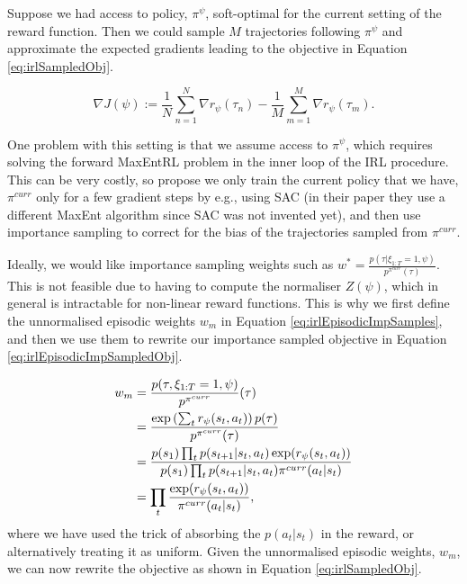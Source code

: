 \documentclass{report}
\numberwithin{equation}{section}
\numberwithin{figure}{section}
\numberwithin{table}{section}
\numberwithin{algorithm}{section}
\begin{document}
Suppose we had access to policy, $\pi^\psi$, soft-optimal for the 
current setting of the reward function.
Then we could sample $M$ trajectories following $\pi^\psi$ 
and approximate the expected gradients leading to the 
objective in Equation \ref{eq:irlSampledObj}.

\begin{equation}\label{eq:irlSampledObj}
  \nabla J(\psi):=\frac{1}{N} \sum_{n=1}^N \nabla r_\psi(\tau_n)
  - \frac{1}{M}\sum_{m=1}^M \nabla r_\psi(\tau_m).
\end{equation}

One problem with this setting is that we assume access to $\pi^\psi$, 
which requires solving the forward MaxEntRL problem in the 
inner loop of the IRL procedure. This can be very costly, so 
\cite{FinnGCL} propose we only train the current policy that 
we have, $\pi^{curr}$ only for a few gradient steps by e.g., 
using SAC (in their paper they use a different MaxEnt algorithm 
since SAC was not invented yet), and then use importance sampling 
to correct for the bias of the trajectories sampled from $\pi^{curr}$.

Ideally, we would like importance sampling weights such as 
$w^*=\frac{p(\tau|\xi_{1:T}=1,\psi)}{p^{\pi^{curr}}(\tau)}$. 
This is not feasible due to having to compute the normaliser 
$Z(\psi)$, which in general is intractable for non-linear reward 
functions. This is why we first 
define the unnormalised episodic weights $w_m$ 
in Equation \ref{eq:irlEpisodicImpSamples}, and then 
we use them to rewrite our importance sampled objective 
in Equation \ref{eq:irlEpisodicImpSampledObj}.

\begin{align}\label{eq:irlEpisodicImpSamples}
  w_m&=\frac{p(\tau,\xi_{1:T}=1,\psi)}{p^{\pi^{curr}}}(\tau)\notag\\
  &=\frac{\exp\left(
      \sum_t r_\psi(s_t,a_t)
    \right)p(\tau)
  }{
    p^{\pi^{curr}}(\tau)
  }\notag\\
  &=\frac{
    p(s_1)\prod_t p(s_{t+1}|s_t,a_t)\exp(r_\psi(s_t,a_t))
  }{
    p(s_1)\prod_t p(s_{t+1}|s_t,a_t)\pi^{curr}(a_t|s_t)
  }\notag\\
  &=\prod_t\frac{\exp(r_\psi(s_t,a_t))}{\pi^{curr}(a_t|s_t)},
\end{align}
where we have used the trick of absorbing the $p(a_t|s_t)$ in 
the reward, or alternatively treating it as uniform.
Given the unnormalised episodic weights, $w_m$, we can now 
rewrite the objective as shown in Equation \ref{eq:irlSampledObj}.
\end{document}
